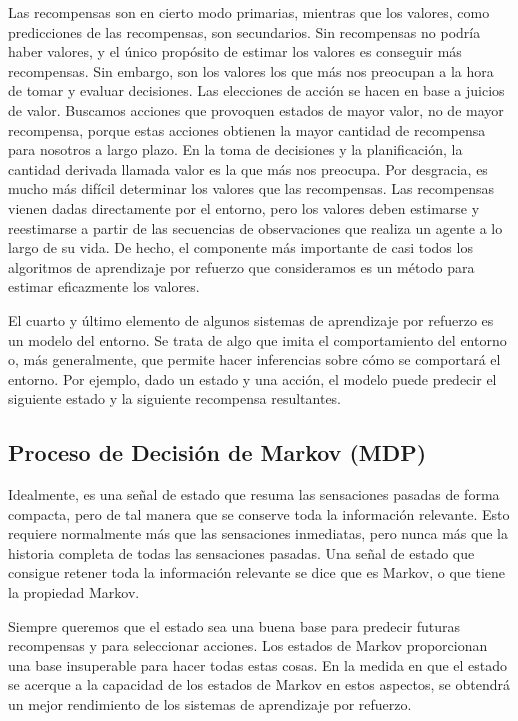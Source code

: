 Las recompensas son en cierto modo primarias, mientras que los valores, como predicciones de las recompensas, son secundarios. Sin recompensas no podría haber valores, y el único propósito de estimar los valores es conseguir más recompensas. Sin embargo, son los valores los que más nos preocupan a la hora de tomar y evaluar decisiones. Las elecciones de acción se hacen en base a juicios de valor. Buscamos acciones que provoquen estados de mayor valor, no de mayor recompensa, porque estas acciones obtienen la mayor cantidad de recompensa para nosotros a largo plazo. En la toma de decisiones y la planificación, la cantidad derivada llamada valor es la que más nos preocupa. Por desgracia, es mucho más difícil determinar los valores que las recompensas. Las recompensas vienen dadas directamente por el entorno, pero los valores deben estimarse y reestimarse a partir de las secuencias de observaciones que realiza un agente a lo largo de su vida. De hecho, el componente más importante de casi todos los algoritmos de aprendizaje por refuerzo que consideramos es un método para estimar eficazmente los valores.

El cuarto y último elemento de algunos sistemas de aprendizaje por refuerzo es un modelo del entorno. Se trata de algo que imita el comportamiento del entorno o, más generalmente, que permite hacer inferencias sobre cómo se comportará el entorno. Por ejemplo, dado un estado y una acción, el modelo puede predecir el siguiente estado y la siguiente recompensa resultantes.


\subsection*{Proceso de Decisión de Markov (MDP)}

Idealmente, es una señal de estado que resuma las sensaciones pasadas de forma compacta, pero de tal manera que se conserve toda la información relevante. Esto requiere normalmente más que las sensaciones inmediatas, pero nunca más que la historia completa de todas las sensaciones pasadas. Una señal de estado que consigue retener toda la información relevante se dice que es Markov, o que tiene la propiedad Markov.

Siempre queremos que el estado sea una buena base para predecir futuras recompensas y para seleccionar acciones. Los estados de Markov proporcionan una base insuperable para hacer todas estas cosas. En la medida en que el estado se acerque a la capacidad de los estados de Markov en estos aspectos, se obtendrá un mejor rendimiento de los sistemas de aprendizaje por refuerzo.

